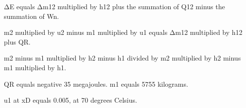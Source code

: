 ΔE equals Δm12 multiplied by h12 plus the summation of Q12 minus the summation of Wn.  

m2 multiplied by u2 minus m1 multiplied by u1 equals Δm12 multiplied by h12 plus QR.  

m2 minus m1 multiplied by h2 minus h1 divided by m2 multiplied by h2 minus m1 multiplied by h1.  

QR equals negative 35 megajoules.  
m1 equals 5755 kilograms.  

u1 at xD equals 0.005, at 70 degrees Celsius.